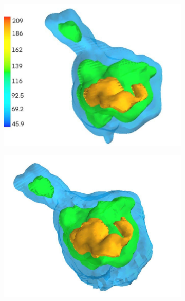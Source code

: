 \begin{figure}[ht!]
    \centering
    \begin{subfigure}[b]{0.22\linewidth}
        \centering
        \includegraphics[width=0.99\linewidth]{figures/5j0n_reconstruction_GT}
        \caption{}
    \end{subfigure}
    \hfill
    \begin{subfigure}[b]{0.22\linewidth}
        \centering
        \includegraphics[width=0.99\linewidth]{figures/5j0n_reconstruction_GT_noise16}
        \caption{}
    \end{subfigure}
    \hfill
    \begin{subfigure}[b]{0.22\linewidth}

\end{subfigure}
\end{figure}
